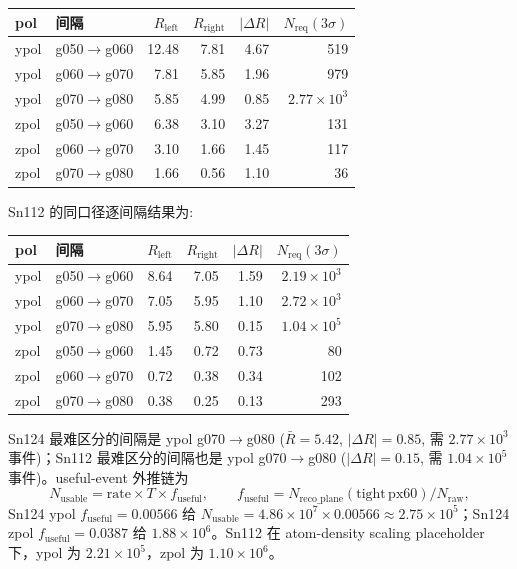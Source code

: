 \documentclass[a4paper,11pt]{article}
\begin{document}
\begin{table}[H]
\centering
\begin{tabular}{llrrrr}
\toprule
pol & 间隔 & $R_{\mathrm{left}}$ & $R_{\mathrm{right}}$ & $|\Delta R|$ & $N_{\mathrm{req}}(3\sigma)$ \\
\midrule
ypol & g050$\to$g060 & 12.48 & 7.81 & 4.67 & 519 \\
ypol & g060$\to$g070 & 7.81 & 5.85 & 1.96 & 979 \\
ypol & g070$\to$g080 & 5.85 & 4.99 & 0.85 & $2.77\times10^3$ \\
zpol & g050$\to$g060 & 6.38 & 3.10 & 3.27 & 131 \\
zpol & g060$\to$g070 & 3.10 & 1.66 & 1.45 & 117 \\
zpol & g070$\to$g080 & 1.66 & 0.56 & 1.10 & 36 \\
\bottomrule
\end{tabular}
\end{table}

Sn112 的同口径逐间隔结果为:

\begin{table}[H]
\centering
\begin{tabular}{llrrrr}
\toprule
pol & 间隔 & $R_{\mathrm{left}}$ & $R_{\mathrm{right}}$ & $|\Delta R|$ & $N_{\mathrm{req}}(3\sigma)$ \\
\midrule
ypol & g050$\to$g060 & 8.64 & 7.05 & 1.59 & $2.19\times10^3$ \\
ypol & g060$\to$g070 & 7.05 & 5.95 & 1.10 & $2.72\times10^3$ \\
ypol & g070$\to$g080 & 5.95 & 5.80 & 0.15 & $1.04\times10^5$ \\
zpol & g050$\to$g060 & 1.45 & 0.72 & 0.73 & 80 \\
zpol & g060$\to$g070 & 0.72 & 0.38 & 0.34 & 102 \\
zpol & g070$\to$g080 & 0.38 & 0.25 & 0.13 & 293 \\
\bottomrule
\end{tabular}
\end{table}

Sn124 最难区分的间隔是 ypol g070$\to$g080 ($\bar R=5.42$, $|\Delta R|=0.85$, 需 $2.77\times10^3$ 事件)；Sn112 最难区分的间隔也是 ypol g070$\to$g080 ($|\Delta R|=0.15$, 需 $1.04\times10^5$ 事件)。useful-event 外推链为
\[
  N_{\mathrm{usable}} = \mathrm{rate}\times T \times f_{\mathrm{useful}}, \qquad
  f_{\mathrm{useful}} = N_{\mathrm{reco\_plane}}(\mathrm{tight\,px60})/N_{\mathrm{raw}},
\]
Sn124 ypol $f_{\mathrm{useful}}=0.00566$ 给 $N_{\mathrm{usable}}=4.86\times10^7\times0.00566\approx2.75\times10^5$；Sn124 zpol $f_{\mathrm{useful}}=0.0387$ 给 $1.88\times10^6$。Sn112 在 atom-density scaling placeholder 下，ypol 为 $2.21\times10^5$，zpol 为 $1.10\times10^6$。
\end{document}
